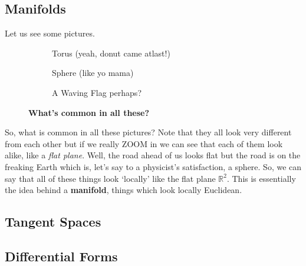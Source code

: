 \subsection{Manifolds}
Let us see some pictures. 
\begin{figure}[H]
  \centering

  \begin{subfigure}[b]{0.3\textwidth}
    \centering
    
    \caption{Torus (yeah, donut came atlast!)}
  \end{subfigure}
  \hfill
  \begin{subfigure}[b]{0.3\textwidth}
    \centering
    
    \caption{Sphere (like yo mama)}
  \end{subfigure}
  \hfill
  \begin{subfigure}[b]{0.3\textwidth}
    \centering
    
    \caption{A Waving Flag perhaps?}
  \end{subfigure}

  \caption{\textbf{What's common in all these?}}
\end{figure}
\noindent
So, what is common in all these pictures? Note that they all look very different from each other but if we really ZOOM in  we can see that each of them look alike, like a \textit{flat plane}. Well, the road ahead of us looks flat but the road is on the freaking Earth which is, let's say to a physicist's satisfaction, a sphere. So, we can say that all of these things look `locally' like the flat plane $\mathbb{R}^2$. This is essentially the idea behind a \textbf{manifold}, things which look locally Euclidean. 
\subsection{Tangent Spaces}
\subsection{Differential Forms}
